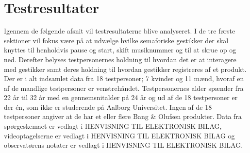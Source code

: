 \chapter{Testresultater}
\label{Testresultater}
%
Igennem de følgende afsnit vil testresultaterne blive analyseret. I de tre første sektioner vil fokus være på at udvælge hvilke semaforiske gestikker der skal knyttes til henholdvis pause og start, skift musiknummer og til at skrue op og ned. Derefter belyses testpersonernes holdning til hvordan det er at interagere med gestikker samt deres holdning til hvordan gestikker registreres af et produkt.\blankline
%
Der er i alt indsamlet data fra 18 testpersoner; 7 kvinder og 11 mænd, hvoraf en af de mandlige testpersoner er venstrehåndet. Testpersonernes alder spænder fra 22 år til 32 år med en gennemsnitalder på 24 år og ud af de 18 testpersoner er der én, som ikke er studerende på Aalborg Universitet. Ingen af de 18 testpersoner angiver at de har et eller flere Bang $\&$ Olufsen produkter. Data fra spørgeskemaet er vedlagt i HENVISNING TIL ELEKTRONISK BILAG, videoptagelserne er vedlagt i HENVISNING TIL ELEKTRONISK BILAG og observatørens notater er vedlagt i HENVISNING TIL ELEKTRONISK BILAG.     